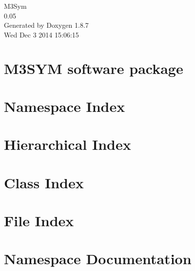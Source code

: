 \documentclass[twoside]{book}
\newcommand{\+}{\discretionary{\mbox{\scriptsize$\hookleftarrow$}}{}{}}
\newcommand{\clearemptydoublepage}{%
  \newpage{\pagestyle{empty}\cleardoublepage}%
}
\begin{document}
\hypersetup{pageanchor=false,
             bookmarks=true,
             bookmarksnumbered=true,
             pdfencoding=unicode
            }
\begin{titlepage}
\vspace*{7cm}
\begin{center}%
{\Large M3\+Sym \\[1ex]\large 0.\+05 }\\
\vspace*{1cm}
{\large Generated by Doxygen 1.8.7}\\
\vspace*{0.5cm}
{\small Wed Dec 3 2014 15:06:15}\\
\end{center}
\end{titlepage}
\clearemptydoublepage
\tableofcontents
\clearemptydoublepage
{}
\hypersetup{pageanchor=true}

\chapter{M3\+S\+Y\+M software package}
\label{index}\hypertarget{index}{}
\chapter{Namespace Index}

\chapter{Hierarchical Index}

\chapter{Class Index}

\chapter{File Index}

\chapter{Namespace Documentation}



\end{document}
